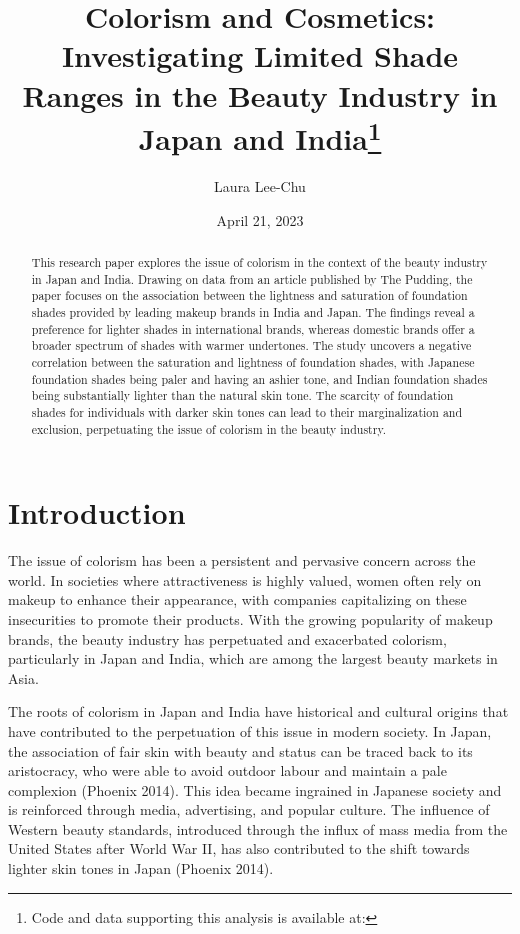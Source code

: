 \documentclass[
  letterpaper,
  DIV=11,
  numbers=noendperiod]{scrartcl}
\title{Colorism and Cosmetics: Investigating Limited Shade Ranges in the
Beauty Industry in Japan and India\thanks{Code and data supporting this
analysis is available at:}}
\author{Laura Lee-Chu}
\date{April 21, 2023}
\renewcommand*\contentsname{Table of contents}
\newcommand\contentsname{Table of contents}
\begin{document}
\maketitle
\begin{abstract}
This research paper explores the issue of colorism in the context of the
beauty industry in Japan and India. Drawing on data from an article
published by The Pudding, the paper focuses on the association between
the lightness and saturation of foundation shades provided by leading
makeup brands in India and Japan. The findings reveal a preference for
lighter shades in international brands, whereas domestic brands offer a
broader spectrum of shades with warmer undertones. The study uncovers a
negative correlation between the saturation and lightness of foundation
shades, with Japanese foundation shades being paler and having an ashier
tone, and Indian foundation shades being substantially lighter than the
natural skin tone. The scarcity of foundation shades for individuals
with darker skin tones can lead to their marginalization and exclusion,
perpetuating the issue of colorism in the beauty industry.
\end{abstract}
\ifdefined\Shaded\renewenvironment{Shaded}{\begin{tcolorbox}[sharp corners, interior hidden, boxrule=0pt, enhanced, frame hidden, breakable, borderline west={3pt}{0pt}{shadecolor}]}{\end{tcolorbox}}\fi

\renewcommand*\contentsname{Table of contents}
{
\hypersetup{linkcolor=}
\setcounter{tocdepth}{3}
\tableofcontents
}
\newpage

\hypertarget{introduction}{%
\section{Introduction}\label{introduction}}

The issue of colorism has been a persistent and pervasive concern across
the world. In societies where attractiveness is highly valued, women
often rely on makeup to enhance their appearance, with companies
capitalizing on these insecurities to promote their products. With the
growing popularity of makeup brands, the beauty industry has perpetuated
and exacerbated colorism, particularly in Japan and India, which are
among the largest beauty markets in Asia.

The roots of colorism in Japan and India have historical and cultural
origins that have contributed to the perpetuation of this issue in
modern society. In Japan, the association of fair skin with beauty and
status can be traced back to its aristocracy, who were able to avoid
outdoor labour and maintain a pale complexion (Phoenix 2014). This idea
became ingrained in Japanese society and is reinforced through media,
advertising, and popular culture. The influence of Western beauty
standards, introduced through the influx of mass media from the United
States after World War II, has also contributed to the shift towards
lighter skin tones in Japan (Phoenix 2014).
\end{document}
